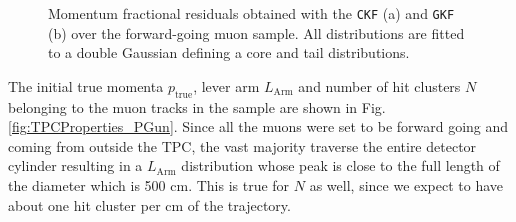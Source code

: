 \begin{figure}[t]
\begin{subfigure}{0.42\textwidth}
         \caption{}
         \label{fig:pResGKF13_PGun}
     \end{subfigure}
        \caption[Momentum fractional residuals obtained with the \texttt{CKF} (a) and \texttt{GKF} (b) over the forward-going muon sample.]{Momentum fractional residuals obtained with the \texttt{CKF} (a) and \texttt{GKF} (b) over the forward-going muon sample. All distributions are fitted to a double Gaussian defining a core and tail distributions.}
        \label{fig:pRes1D_PGun}
\end{figure}


The initial true momenta $p_\textrm{true}$, lever arm $L_\textrm{Arm}$ and number of hit clusters $N$ belonging to the muon tracks in the sample are shown in Fig. \ref{fig:TPCProperties_PGun}. Since all the muons were set to be forward going and coming from outside the TPC, the vast majority traverse the entire detector cylinder resulting in a $L_\textrm{Arm}$ distribution whose peak is close to the full length of the diameter which is 500 cm. This is true for $N$ as well, since we expect to have about one hit cluster per cm of the trajectory.

